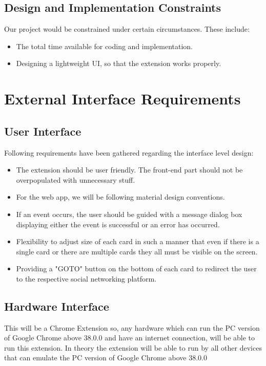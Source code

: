\documentclass[12pt]{article}
\begin{document}
\subsection{Design and Implementation Constraints}
Our project would be constrained under certain circumstances. These
include:
\begin{itemize}
    \item  The total time available for coding and implementation.

    \item Designing a lightweight UI, so that the extension works properly.
\end{itemize}

\section{External Interface Requirements}
\subsection{User Interface}
Following requirements have been gathered regarding the
interface level design:

\begin{itemize}
    \item The extension should be user friendly. The front-end
part should not be overpopulated with unnecessary
stuff.
    \item For the web app, we will be following material design
conventions.
    \item If an event occurs, the user should be guided with a
message dialog box displaying either the event is successful or an error has occurred.
    \item Flexibility to adjust size of each card in such a
manner that even if there is a single card or there
are multiple cards they all must be visible on the
screen.
    \item Providing a {"}GOTO{"} button on the bottom of each card to redirect
the user to the respective social networking platform. 
\end{itemize}

\subsection{Hardware Interface}
This will be a Chrome Extension so, any hardware which
can run the PC version of Google Chrome above 38.0.0 and
have an internet connection, will be able to run this
extension. In theory the extension will be able to run by all
other devices that can emulate the PC version of Google
Chrome above 38.0.0
\end{document}
